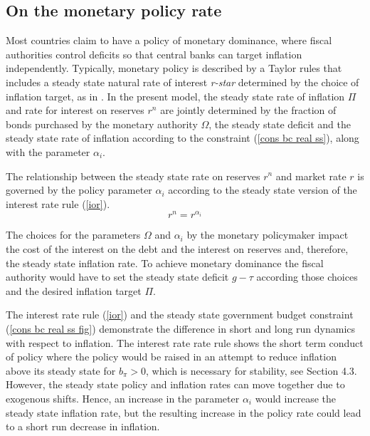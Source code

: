 \documentclass[]{article}
\begin{document}
\subsection{On the monetary policy rate}

 Most countries claim to have a policy of monetary dominance, where fiscal authorities control deficits so that central banks can target inflation independently. Typically, monetary policy is described by a Taylor rules that includes a steady state natural rate of interest \textit{r-star} determined by the choice of inflation target, as in \textcite{Platanov2024flexpricedeterminacy}. In the present model, the steady state rate of inflation $\Pi$ and rate for interest on reserves $r^{n}$ are jointly determined by the fraction of bonds purchased by the monetary authority $\Omega$, the steady state deficit and the steady state rate of inflation according to the constraint (\ref{cons bc real ss}), along with the parameter $\alpha_{i}$. 
 
 The relationship between the steady state rate on reserves $r^{n}$ and market rate $r$ is governed by the policy parameter $\alpha_{i}$ according to the steady state version of the interest rate rule (\ref{ior}).
\begin{equation}
  r^{n}=r^{\alpha_{i}} \label{ior ss}  
\end{equation}

The choices for the parameters $\Omega$ and $\alpha_{i}$ by the monetary policymaker impact the cost of the interest on the debt and the interest on reserves and, therefore, the steady state inflation rate. To achieve monetary dominance the fiscal authority would have to set the steady state deficit $g-\tau$ according those choices and the desired inflation target $\Pi$.

The interest rate rule (\ref{ior}) and the steady state government budget constraint (\ref{cons bc real ss fig}) demonstrate the difference in short and long run dynamics with respect to inflation. The interest rate rate rule shows the short term conduct of policy where the policy would be raised in an attempt to reduce inflation above its steady state for $b_{\pi}>0$, which is necessary for stability, see Section 4.3. However, the steady state policy and inflation rates can move together due to exogenous shifts. Hence, an increase in the parameter $\alpha_{i}$ would increase the steady state inflation rate, but the resulting increase in the policy rate could lead to a short run decrease in inflation.
\end{document}
